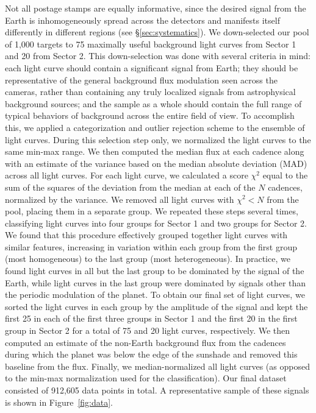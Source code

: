 \documentclass[modern]{aastex62}
\begin{document}
Not all postage stamps are equally informative, since the desired signal from 
the Earth is inhomogeneously spread across the \TESS detectors and manifests itself
differently in different regions (see \S\ref{sec:systematics}). 
We down-selected our pool of 1,000 targets to 75 maximally useful background 
light curves from Sector 1 and 20 from Sector 2. 
This down-selection was done with several criteria in mind: each light curve 
should contain a significant signal from Earth; they should be representative 
of the general background flux modulation seen across the \TESS cameras, rather 
than containing any truly localized signals from astrophysical background 
sources; and the sample as a whole should contain the full range of typical 
behaviors of background across the entire \TESS field of view. 
To accomplish this, we applied a categorization and outlier rejection scheme to the ensemble of light curves.
During this selection step only, we normalized the light curves to the same min-max range.
We then computed the median
flux at each cadence along with an estimate of the variance based on the
median absolute deviation (MAD) across all light curves.
For each light curve, we calculated a score $\chi^2$ equal to the sum of the squares of the
deviation from the median at each of the $N$ cadences, normalized by the variance.
We removed all light curves with $\chi^2 < N$ from the pool, placing
them in a separate group. We repeated these steps several times,
classifying light curves into four groups for Sector 1 and two groups for Sector 2. 
We found that this
procedure effectively grouped together light curves with similar features,
increasing in variation within each group from the first group (most homogeneous) 
to the last group (most heterogeneous). In practice, we found light curves
in all but the last group to be dominated by 
the signal of the Earth, while light
curves in the last group were dominated by signals other than the
periodic modulation of the planet. To obtain our final set of light curves, 
we sorted the light curves in each group by the amplitude
of the signal and kept the first 25 in each of the first three groups in Sector 1
and the first 20 in the first group in Sector 2 for a total
of 75 and 20 light curves, respectively. We then computed an estimate of the
non-Earth background flux from the cadences during which the planet was below
the edge of the sunshade and removed this baseline from the flux.
Finally, we median-normalized all light curves (as opposed to the min-max
normalization used for the classification).
Our final dataset consisted of 912,605 data points in total. 
A representative sample of these signals is shown in Figure~\ref{fig:data}.
\end{document}
